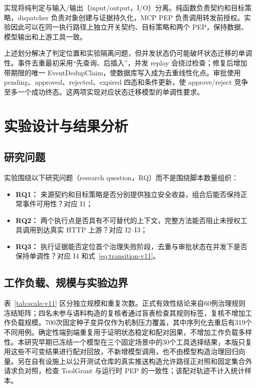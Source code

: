 实现将纯判定与输入/输出（input/output，I/O）分离。纯函数负责契约和目标策略，dispatcher 负责对象创建与证据持久化，MCP PEP 负责调用转发前授权。实验因此可以在同一执行路径上独立开关契约、目标策略和两个 PEP，保持数据、模型输出和上游工具一致。

上述划分解决了判定位置和实验隔离问题，但并发状态仍可能破坏状态迁移的单调性。事件去重最初采用“先查询、后插入”，并发 replay 会绕过检查；修复后增加带期限的唯一 EventDedupClaim，使数据库写入成为去重线性化点。审批使用 pending、approved、rejected、expired 四态和条件更新，使 approve/reject 竞争至多一个成功终态。这两项实现对应状态迁移模型的单调性要求。

\section{实验设计与结果分析}\label{sec:evaluation-v11}

\subsection{研究问题}

实验围绕以下研究问题（research question，RQ）而不是围绕脚本数量组织：
\begin{itemize}
  \item \textbf{RQ1：} 来源契约和目标策略是否分别提供独立安全收益，组合后能否保持正常事件可用性？对应 I1；
  \item \textbf{RQ2：} 两个执行点是否具有不可替代的上下文，完整方法能否阻止未授权工具调用到达真实 HTTP 上游？对应 I2--I3；
  \item \textbf{RQ3：} 执行证据能否定位首个治理失败阶段，去重与审批状态在并发下是否保持单调性？对应 I4 和式~\eqref{eq:transition-v11}。
\end{itemize}

\subsection{工作负载、规模与实验边界}

表~\ref{tab:scale-v11} 区分独立规模和重复次数。正式有效性结论来自60例治理规则冻结矩阵；四名未参与语料构造的复核者通过盲表检查其规则标签，复核不增加工作负载规模。700次固定种子变异仅作为机制压力覆盖，其中序列化去重后有319个不同用例。确定性端到端重复用于证明状态稳定和配对因果，不增加工作负载多样性。本研究早期已冻结一个模型在三个固定场景中的30个工具选择结果，本版只复用这些不可变结果进行配对回放，不新增模型调用，也不由模型构造治理回归向量。另在自有设施上以公开测试仓库的真实推送构造允许路径正对照和固定集合外请求负对照，检查 ToolGrant 与运行时 PEP 的一致性；该配对轨迹不计入统计样本。

